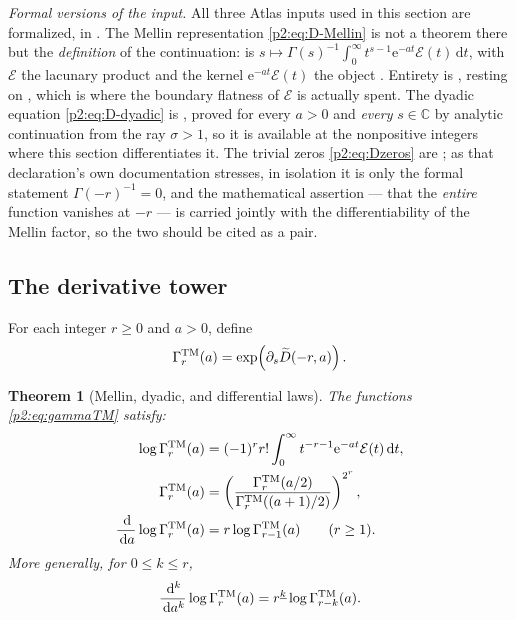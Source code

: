 \documentclass[11pt,oneside]{article}
\numberwithin{equation}{section}
\newtheorem{theorem}{Theorem}[section]
\theoremstyle{definition}
\theoremstyle{remark}
\newcommand{\C}{\mathbb C}
\newcommand{\e}{\mathrm e}
\newcommand{\dd}{\,\mathrm d}
\newcommand{\fall}[2]{#1^{\underline{#2}}}
\begin{document}
\emph{Formal versions of the input.}  All three Atlas inputs used in this section are
formalized, in .  The Mellin representation
\eqref{p2:eq:D-Mellin} is not a theorem there but the \emph{definition} of the continuation:
 is $s\mapsto\Gamma(s)^{-1}\!\int_0^\infty
t^{s-1}\e^{-at}\mathcal E(t)\dd t$, with $\mathcal E$ the lacunary product
 and the kernel $\e^{-at}\mathcal E(t)$ the object
.  Entirety is
, resting on
, which is where the boundary flatness of
$\mathcal E$ is actually spent.  The dyadic equation \eqref{p2:eq:D-dyadic} is
, proved for every $a>0$ and \emph{every}
$s\in\C$ by analytic continuation from the ray $\sigma>1$, so it is available at the
nonpositive integers where this section differentiates it.  The trivial zeros
\eqref{p2:eq:Dzeros} are ; as that
declaration's own documentation stresses, in isolation it is only the formal statement
$\Gamma(-r)^{-1}=0$, and the mathematical assertion --- that the \emph{entire} function
vanishes at $-r$ --- is carried jointly with the differentiability of the Mellin factor, so
the two should be cited as a pair.

\subsection{The derivative tower}

\begin{definition}
For each integer $r\ge0$ and $a>0$, define
\begin{equation}
 \Gamma_r^{\rm TM}(a)
 =\exp\!\left(\partial_s\widetilde D(-r,a)\right).
 \label{p2:eq:gammaTM}
\end{equation}
\end{definition}

\begin{theorem}[Mellin, dyadic, and differential laws]
\label{p2:thm:gamma-tower}
The functions \eqref{p2:eq:gammaTM} satisfy:
\begin{align}
 \log\Gamma_r^{\rm TM}(a)
 &=(-1)^rr!\int_0^\infty
 t^{-r-1}\e^{-at}\mathcal E(t)\dd t,
 \label{p2:eq:gamma-Mellin}\\
 \Gamma_r^{\rm TM}(a)
 &=\left(
 \frac{\Gamma_r^{\rm TM}(a/2)}
 {\Gamma_r^{\rm TM}((a+1)/2)}
 \right)^{2^r},
 \label{p2:eq:gamma-dyadic}\\
 \frac{\dd}{\dd a}\log\Gamma_r^{\rm TM}(a)
 &=r\log\Gamma_{r-1}^{\rm TM}(a)
 \qquad(r\ge1).
 \label{p2:eq:gamma-differential}
\end{align}
More generally, for $0\le k\le r$,
\begin{equation}
 \frac{\dd^k}{\dd a^k}\log\Gamma_r^{\rm TM}(a)
 =\fall{r}{k}\log\Gamma_{r-k}^{\rm TM}(a).
 \label{p2:eq:gamma-iterated}
\end{equation}
\newresult
\end{theorem}
\end{document}
